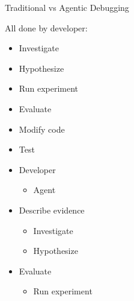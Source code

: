 \documentclass[
ps,
]{prosper}
\begin{document}
\begin{slide}{Traditional vs Agentic Debugging}

\begin{minipage}[t]{5.6cm}

All done by developer:
  
\begin{itemize}

\item Investigate

\item Hypothesize

\item Run experiment

\item Evaluate

\item Modify code

\item Test
  
\end{itemize}

\end{minipage}
%
\begin{minipage}[t]{5.6cm}

\begin{itemize}

\item Developer

  \begin{itemize}
    
  \item Agent
    
  \end{itemize}

\item Describe evidence

  \begin{itemize}
    
  \item Investigate

  \item Hypothesize
    
  \end{itemize}

\item Evaluate

  \begin{itemize}
    
  \item Run experiment


\end{itemize}
\end{itemize}
\end{minipage}
\end{slide}
\end{document}
